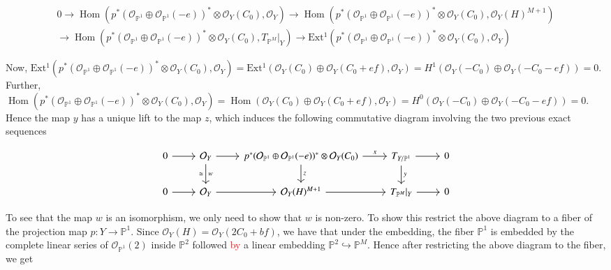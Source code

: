 \documentclass[11pt,twoside]{amsart}
\theoremstyle{plain}
\numberwithin{equation}{section}
\theoremstyle{definition}
\begin{document}
\begin{multline*}
0 \to \operatorname{Hom}(p^*(\mathcal{O}_{\mathbb{P}^1} \oplus \mathcal{O}_{\mathbb{P}^1}(-e))^* \otimes \mathcal{O}_{Y}(C_0), \mathcal{O}_Y) \to \operatorname{Hom}(p^*(\mathcal{O}_{\mathbb{P}^1} \oplus \mathcal{O}_{\mathbb{P}^1}(-e))^* \otimes \mathcal{O}_{Y}(C_0), \mathcal{O}_Y(H)^{M+1}) \\ \to \operatorname{Hom}(p^*(\mathcal{O}_{\mathbb{P}^1} \oplus \mathcal{O}_{\mathbb{P}^1}(-e))^* \otimes \mathcal{O}_Y(C_0), T_{\mathbb{P}^M}|_Y) \to \operatorname{Ext^1}(p^*(\mathcal{O}_{\mathbb{P}^1} \oplus \mathcal{O}_{\mathbb{P}^1}(-e))^* \otimes \mathcal{O}_Y(C_0), \mathcal{O}_Y)
\end{multline*}

Now, $\operatorname{Ext^1}(p^*(\mathcal{O}_{\mathbb{P}^1} \oplus \mathcal{O}_{\mathbb{P}^1}(-e))^* \otimes \mathcal{O}_Y(C_0), \mathcal{O}_Y) = \operatorname{Ext^1}(\mathcal{O}_Y(C_0) \oplus \mathcal{O}_Y(C_0+ef), \mathcal{O}_Y) = H^1(\mathcal{O}_Y(-C_0) \oplus \mathcal{O}_Y(-C_0-ef)) = 0$.
Further, $\operatorname{Hom}(p^*(\mathcal{O}_{\mathbb{P}^1} \oplus \mathcal{O}_{\mathbb{P}^1}(-e))^* \otimes \mathcal{O}_Y(C_0), \mathcal{O}_Y) = \operatorname{Hom}(\mathcal{O}_Y(C_0) \oplus \mathcal{O}_Y(C_0+ef), \mathcal{O}_Y) = H^0(\mathcal{O}_Y(-C_0) \oplus \mathcal{O}_Y(-C_0-ef)) = 0$. Hence the map $y$ has a unique lift to the map $z$, which induces the following commutative diagram involving the two previous exact sequences

\[
\begin{tikzcd}\label{relative Euler and Euler without -H}
  0 \arrow[r] & \mathcal{O}_Y \arrow[r] \arrow[d, "w", "\cong"'] & p^*(\mathcal{O}_{\mathbb{P}^1} \oplus \mathcal{O}_{\mathbb{P}^1}(-e))^* \otimes \mathcal{O}_Y(C_0) \arrow[r, "x"] \arrow[d, "z"] & T_{Y/\mathbb{P}^1} \arrow[r] \arrow[d, "y"] & 0 \\
   0 \arrow[r] & \mathcal{O}_Y \arrow[r] & \mathcal{O}_Y(H)^{M+1} \arrow[r] & T_{\mathbb{P}^M}|_Y \arrow[r] & 0
\end{tikzcd}
\]

To see that the map $w$ is an isomorphism, we only need to show that $w$ is non-zero. To show this restrict the above diagram to a fiber of the projection map $p: Y \to \mathbb{P}^1$. Since $\mathcal{O}_Y(H) = \mathcal{O}_Y(2C_0+bf)$, we have that under the embedding, the fiber $\mathbb{P}^1$ is embedded by the complete linear series of $\mathcal{O}_{\mathbb{P}^1}(2)$ inside $\mathbb{P}^2$ followed \textcolor{red}{by} a linear embedding $\mathbb{P}^2 \hookrightarrow \mathbb{P}^M$. Hence after restricting the above diagram to the fiber, we get
\end{document}
